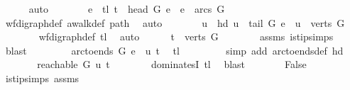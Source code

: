 \begin{isabellebody}
\ \ \ \ \isamarkupfalse%
\ auto\isanewline
\ \ \ \ \isamarkupfalse%
\ \isamarkupfalse%
\ e\ \ tl{\isacharcolon}{\kern0pt}\ {\isachardoublequoteopen}t\ {\isacharequal}{\kern0pt}\ {\isacharparenleft}{\kern0pt}head\ G\ e{\isacharparenright}{\kern0pt}\ {\isasymand}\ e\ {\isasymin}\ arcs\ G{\isachardoublequoteclose}\isanewline
\ \ \ \ \ \ \isamarkupfalse%
\ wf{\isacharunderscore}{\kern0pt}digraph{\isacharunderscore}{\kern0pt}def\ awalk{\isacharunderscore}{\kern0pt}def\ path\ \isamarkupfalse%
\ auto\isanewline
\ \ \ \ \isamarkupfalse%
\ \isamarkupfalse%
\ u\ \ hd{\isacharcolon}{\kern0pt}\ {\isachardoublequoteopen}u\ {\isacharequal}{\kern0pt}\ {\isacharparenleft}{\kern0pt}tail\ G\ e{\isacharparenright}{\kern0pt}\ {\isasymand}\ u\ {\isasymin}\ verts\ G{\isachardoublequoteclose}\isanewline
\ \ \ \ \ \ \isamarkupfalse%
\ wf{\isacharunderscore}{\kern0pt}digraph{\isacharunderscore}{\kern0pt}def\ tl\ \isamarkupfalse%
\ auto\isanewline
\ \ \ \ \isamarkupfalse%
\ {\isachardoublequoteopen}t\ {\isasymin}\ verts\ G{\isachardoublequoteclose}\isanewline
\ \ \ \ \ \ \isamarkupfalse%
\ assms{\isacharparenleft}{\kern0pt}{}{\isacharparenright}{\kern0pt}\ is{\isacharunderscore}{\kern0pt}tip{\isachardot}{\kern0pt}simps\ \isamarkupfalse%
\ blast\ \isanewline
\ \ \ \ \isamarkupfalse%
\ \isamarkupfalse%
\ {\isachardoublequoteopen}arc{\isacharunderscore}{\kern0pt}to{\isacharunderscore}{\kern0pt}ends\ G\ e\ {\isacharequal}{\kern0pt}\ {\isacharparenleft}{\kern0pt}u{\isacharcomma}{\kern0pt}\ t{\isacharparenright}{\kern0pt}{\isachardoublequoteclose}\ \isamarkupfalse%
\ tl\ \isanewline
\ \ \ \ \ \ \isamarkupfalse%
\ {\isacharparenleft}{\kern0pt}simp\ add{\isacharcolon}{\kern0pt}\ arc{\isacharunderscore}{\kern0pt}to{\isacharunderscore}{\kern0pt}ends{\isacharunderscore}{\kern0pt}def\ hd{\isacharparenright}{\kern0pt}\ \isanewline
\ \ \ \ \isamarkupfalse%
\ \isamarkupfalse%
\ {\isachardoublequoteopen}reachable{}\ G\ u\ t{\isachardoublequoteclose}\isanewline
\ \ \ \ \ \ \isamarkupfalse%
\ dominatesI\ tl\ \isamarkupfalse%
\ blast\isanewline
\ \ \ \ \isamarkupfalse%
\ \isamarkupfalse%
\ False\isanewline
\ \ \ \ \ \ \isamarkupfalse%
\ is{\isacharunderscore}{\kern0pt}tip{\isachardot}{\kern0pt}simps\ assms{\isacharparenleft}{\kern0pt}{}{\isacharparenright}{\kern0pt}\ \isamarkupfalse%

\end{isabellebody}
